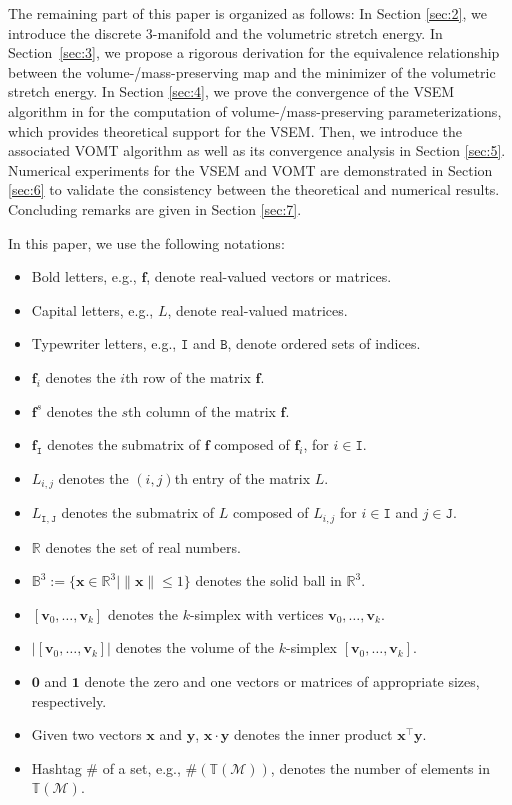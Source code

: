 \documentclass[onefignum,onetabnum]{siamonline220329}
\numberwithin{equation}{section}
\def\bv{\mathbf{v}}
\begin{document}
\begin{sloppypar}
The remaining part of this paper is organized as follows:
In Section \ref{sec:2}, we introduce the discrete $3$-manifold and the volumetric stretch energy. In Section~\ref{sec:3}, we propose a rigorous derivation for the equivalence relationship between the volume-/mass-preserving map and the minimizer of the volumetric stretch energy. In Section \ref{sec:4}, we prove the convergence of the VSEM algorithm in \cite{YuLL19} for the computation of volume-/mass-preserving parameterizations, which provides theoretical support for the VSEM. Then, we introduce the associated VOMT algorithm as well as its convergence analysis in Section \ref{sec:5}. Numerical experiments for the VSEM and VOMT are demonstrated in Section \ref{sec:6} to validate the consistency between the theoretical and numerical results. Concluding remarks are given in Section \ref{sec:7}.

In this paper, we use the following notations:
\begin{itemize}
\item Bold letters, e.g., $\mathbf{f}$, denote real-valued vectors or matrices.
\item Capital letters, e.g., $L$, denote real-valued matrices.
\item Typewriter letters, e.g., $\mathtt{I}$ and $\mathtt{B}$, denote ordered sets of indices.
\item $\mathbf{f}_i$ denotes the $i$th row of the matrix $\mathbf{f}$.
\item $\mathbf{f}^s$ denotes the $s$th column of the matrix $\mathbf{f}$.
\item $\mathbf{f}_\mathtt{I}$ denotes the submatrix of $\mathbf{f}$ composed of $\mathbf{f}_i$, for $i\in\mathtt{I}$.
\item $L_{i,j}$ denotes the $(i,j)$th entry of the matrix $L$.
\item $L_{\mathtt{I},\mathtt{J}}$ denotes the submatrix of $L$ composed of $L_{i,j}$ for $i\in\mathtt{I}$ and $j\in\mathtt{J}$.
\item $\mathbb{R}$ denotes the set of real numbers.
\item $\mathbb{B}^3:=\{ \mathbf{x}\in\mathbb{R}^{3} \mid \|\mathbf{x}\| \leq 1 \}$ denotes the solid ball in $\mathbb{R}^{3}$.
\item $\left[\bv_0, \ldots, \bv_k\right]$ denotes the $k$-simplex with vertices $\bv_0, \ldots, \bv_k$.
\item $|[\bv_0, \ldots, \bv_k]|$ denotes the volume of the $k$-simplex $\left[\bv_0, \ldots, \bv_k\right]$.
\item $\mathbf{0}$ and $\mathbf{1}$ denote the zero and one vectors or matrices of appropriate sizes, respectively.
\item Given two vectors $\mathbf{x}$ and $\mathbf{y}$, $\mathbf{x} \cdot \mathbf{y}$ denotes the inner product $\mathbf{x}^{\top} \mathbf{y}$.
\item Hashtag $\#$ of a set, e.g., $\#(\mathbb{T}(\mathcal{M}))$, denotes the number of elements in $\mathbb{T}(\mathcal{M})$.
\end{itemize}



\end{sloppypar}
\end{document}
